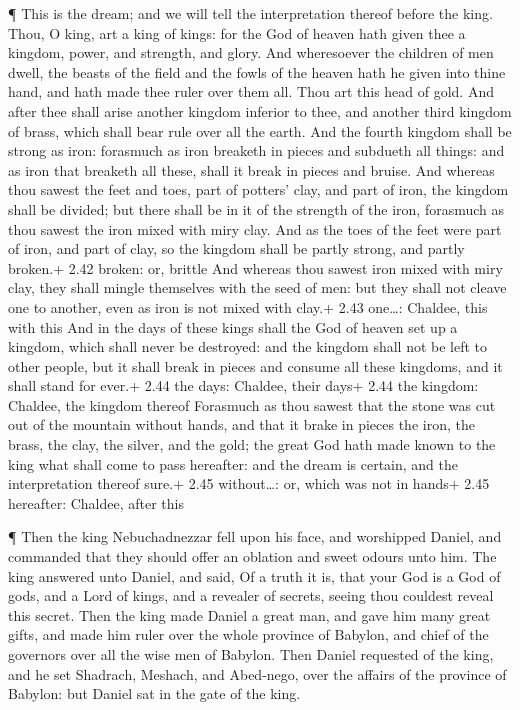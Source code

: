  ¶ This is the dream; and we will tell the interpretation
thereof before the king.  Thou, O king, art a king of
kings: for the God of heaven hath given thee a kingdom, power, and
strength, and glory.  And wheresoever the children of men
dwell, the beasts of the field and the fowls of the heaven hath he given
into thine hand, and hath made thee ruler over them all. Thou art this
head of gold.  And after thee shall arise another kingdom
inferior to thee, and another third kingdom of brass, which shall bear
rule over all the earth.  And the fourth kingdom shall be
strong as iron: forasmuch as iron breaketh in pieces and subdueth all
things: and as iron that breaketh all these, shall it break in pieces
and bruise.  And whereas thou sawest the feet and toes,
part of potters' clay, and part of iron, the kingdom shall be divided;
but there shall be in it of the strength of the iron, forasmuch as thou
sawest the iron mixed with miry clay.  And as the toes of
the feet were part of iron, and part of clay, so the kingdom shall be
partly strong, and partly broken.+ 2.42 broken: or, brittle
 And whereas thou sawest iron mixed with miry clay, they
shall mingle themselves with the seed of men: but they shall not cleave
one to another, even as iron is not mixed with clay.+ 2.43 one\ldots:
Chaldee, this with this  And in the days of these kings
shall the God of heaven set up a kingdom, which shall never be
destroyed: and the kingdom shall not be left to other people, but it
shall break in pieces and consume all these kingdoms, and it shall stand
for ever.+ 2.44 the days: Chaldee, their days+ 2.44 the kingdom:
Chaldee, the kingdom thereof  Forasmuch as thou sawest that
the stone was cut out of the mountain without hands, and that it brake
in pieces the iron, the brass, the clay, the silver, and the gold; the
great God hath made known to the king what shall come to pass hereafter:
and the dream is certain, and the interpretation thereof sure.+ 2.45
without\ldots: or, which was not in hands+ 2.45 hereafter: Chaldee,
after this

 ¶ Then the king Nebuchadnezzar fell upon his face, and
worshipped Daniel, and commanded that they should offer an oblation and
sweet odours unto him.  The king answered unto Daniel, and
said, Of a truth it is, that your God is a God of gods, and a Lord of
kings, and a revealer of secrets, seeing thou couldest reveal this
secret.  Then the king made Daniel a great man, and gave
him many great gifts, and made him ruler over the whole province of
Babylon, and chief of the governors over all the wise men of Babylon.
 Then Daniel requested of the king, and he set Shadrach,
Meshach, and Abed-nego, over the affairs of the province of Babylon: but
Daniel sat in the gate of the king.

